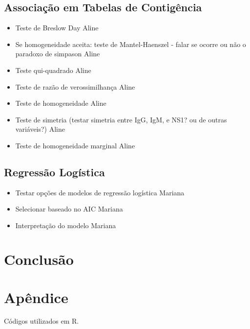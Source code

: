 \documentclass[
]{article}
\providecommand{\tightlist}{%
  \setlength{\itemsep}{0pt}\setlength{\parskip}{0pt}}
\begin{document}
\hypertarget{associauxe7uxe3o-em-tabelas-de-contiguxeancia}{%
\subsection{Associação em Tabelas de
Contigência}\label{associauxe7uxe3o-em-tabelas-de-contiguxeancia}}

\begin{itemize}
\tightlist
\item
  Teste de Breslow Day Aline
\item
  Se homogeneidade aceita: teste de Mantel-Haenszel - falar se ocorre ou
  não o paradoxo de simpason Aline
\item
  Teste qui-quadrado Aline
\item
  Teste de razão de verossimilhança Aline
\item
  Teste de homogeneidade Aline
\item
  Teste de simetria (testar simetria entre IgG, IgM, e NS1? ou de outras
  variáveis?) Aline
\item
  Teste de homogeneidade marginal Aline
\end{itemize}

\hypertarget{regressuxe3o-loguxedstica}{%
\subsection{Regressão Logística}\label{regressuxe3o-loguxedstica}}

\begin{itemize}
\tightlist
\item
  Testar opções de modelos de regressão logística Mariana
\item
  Selecionar baseado no AIC Mariana
\item
  Interpretação do modelo Mariana
\end{itemize}

\hypertarget{conclusuxe3o}{%
\section{Conclusão}\label{conclusuxe3o}}

\hypertarget{apuxeandice}{%
\section{Apêndice}\label{apuxeandice}}

Códigos utilizados em R.
\end{document}
